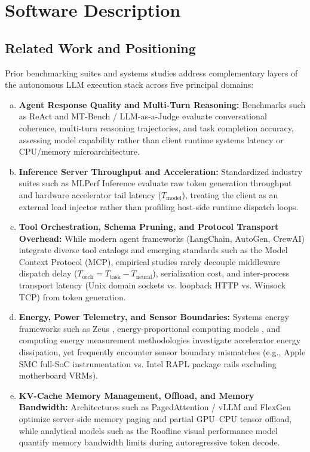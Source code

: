 \documentclass[11pt,a4paper]{article}
\begin{document}
\section{Software Description}
\label{sec:software_description}

\subsection{Related Work and Positioning}
Prior benchmarking suites and systems studies address complementary layers of the autonomous LLM execution stack across five principal domains:
\begin{enumerate}[(a)]
    \item \textbf{Agent Response Quality and Multi-Turn Reasoning:} Benchmarks such as ReAct \cite{yao2023react} and MT-Bench / LLM-as-a-Judge \cite{zheng2023judging} evaluate conversational coherence, multi-turn reasoning trajectories, and task completion accuracy, assessing model capability rather than client runtime systems latency or CPU/memory microarchitecture.
    \item \textbf{Inference Server Throughput and Acceleration:} Standardized industry suites such as MLPerf Inference \cite{reddi2020mlperf} evaluate raw token generation throughput and hardware accelerator tail latency ($T_{\text{model}}$), treating the client as an external load injector rather than profiling host-side runtime dispatch loops.
    \item \textbf{Tool Orchestration, Schema Pruning, and Protocol Transport Overhead:} While modern agent frameworks (LangChain, AutoGen, CrewAI) integrate diverse tool catalogs and emerging standards such as the Model Context Protocol (MCP), empirical studies rarely decouple middleware dispatch delay ($T_{\text{orch}} = T_{\text{task}} - T_{\text{neural}}$), serialization cost, and inter-process transport latency (Unix domain sockets vs. loopback HTTP vs. Winsock TCP) from token generation.
    \item \textbf{Energy, Power Telemetry, and Sensor Boundaries:} Systems energy frameworks such as Zeus \cite{you2023zeus}, energy-proportional computing models \cite{barroso2007case}, and computing energy measurement methodologies \cite{fahad2019comparative} investigate accelerator energy dissipation, yet frequently encounter sensor boundary mismatches (e.g., Apple SMC full-SoC instrumentation vs. Intel RAPL package rails excluding motherboard VRMs).
    \item \textbf{KV-Cache Memory Management, Offload, and Memory Bandwidth:} Architectures such as PagedAttention / vLLM \cite{kwon2023vllm} and FlexGen \cite{sheng2023flexgen} optimize server-side memory paging and partial GPU--CPU tensor offload, while analytical models such as the Roofline visual performance model \cite{williams2009roofline} quantify memory bandwidth limits during autoregressive token decode.
\end{enumerate}
\end{document}

